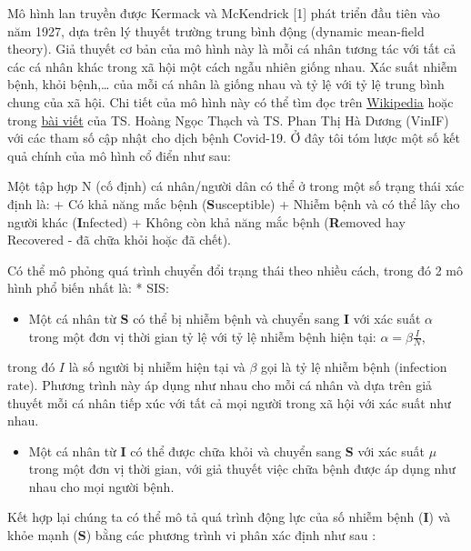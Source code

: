 \documentclass[]{book}
\providecommand{\tightlist}{%
  \setlength{\itemsep}{0pt}\setlength{\parskip}{0pt}}
\begin{document}
Mô hình lan truyền được Kermack và McKendrick {[}1{]} phát triển đầu
tiên vào năm 1927, dựa trên lý thuyết trường trung bình động (dynamic
mean-field theory). Giả thuyết cơ bản của mô hình này là mỗi cá nhân
tương tác với tất cả các cá nhân khác trong xã hội một cách ngẫu nhiên
giống nhau. Xác suất nhiễm bệnh, khỏi bệnh,\ldots{} của mỗi cá nhân là
giống nhau và tỷ lệ với tỷ lệ trung bình chung của xã hội. Chi tiết của
mô hình này có thể tìm đọc trên
\href{https://en.wikipedia.org/wiki/Mathematical_modelling_of_infectious_disease}{Wikipedia}
hoặc trong
\href{http://vinif.org/vi/khoa-hoc-thuong-thuc/read/1/mo-hinh-du-bao-ngan-han-va-dai-han-kha-nang-lan-rong-cua-dich-2019-ncov-tu-vu-han-o-pham-vi-trung-quoc-va-quoc-te}{bài
viết} của TS. Hoàng Ngọc Thạch và TS. Phan Thị Hà Dương (VinIF) với các
tham số cập nhật cho dịch bệnh Covid-19. Ở đây tôi tóm lược một số kết
quả chính của mô hình cổ điển như sau:

Một tập hợp N (cố định) cá nhân/người dân có thể ở trong một số trạng
thái xác định là: + Có khả năng mắc bệnh (\textbf{S}usceptible) + Nhiễm
bệnh và có thể lây cho người khác (\textbf{I}nfected) + Không còn khả
năng mắc bệnh (\textbf{R}emoved hay Recovered - đã chữa khỏi hoặc đã
chết).

Có thể mô phỏng quá trình chuyển đổi trạng thái theo nhiều cách, trong
đó 2 mô hình phổ biến nhất là: * SIS:

\begin{itemize}
\tightlist
\item
  Một cá nhân từ \textbf{S} có thể bị nhiễm bệnh và chuyển sang
  \textbf{I} với xác suất \(\alpha\) trong một đơn vị thời gian tỷ lệ
  với tỷ lệ nhiễm bệnh hiện tại: \(\alpha = \beta\frac{I}{N}\),
\end{itemize}

trong đó \(I\) là số người bị nhiễm hiện tại và \(\beta\) gọi là tỷ lệ
nhiễm bệnh (infection rate). Phương trình này áp dụng như nhau cho mỗi
cá nhân và dựa trên giả thuyết mỗi cá nhân tiếp xúc với tất cả mọi người
trong xã hội với xác suất như nhau.

\begin{itemize}
\tightlist
\item
  Một cá nhân từ \textbf{I} có thể được chữa khỏi và chuyển sang
  \textbf{S} với xác suất \(\mu\) trong một đơn vị thời gian, với giả
  thuyết việc chữa bệnh được áp dụng như nhau cho mọi người bệnh.
\end{itemize}

Kết hợp lại chúng ta có thể mô tả quá trình động lực của số nhiễm bệnh
(\textbf{I}) và khỏe mạnh (\textbf{S}) bằng các phương trình vi phân xác
định như sau :
\end{document}
